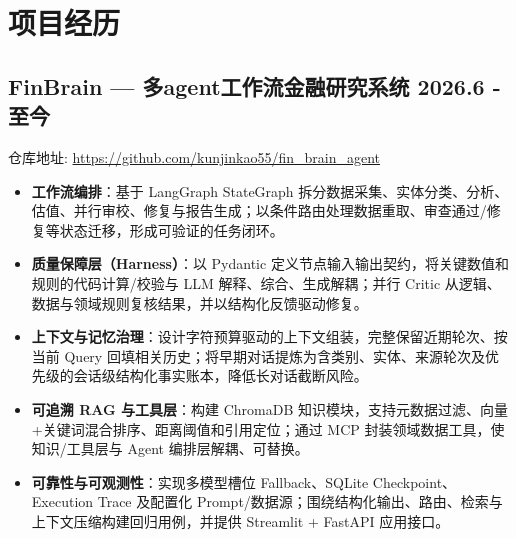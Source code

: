 \documentclass[10pt,a4paper]{article}
\newcommand{\datedsubsection}[2]{%
  \subsection[#1]{#1 \hfill #2}%
}
\begin{document}
\section{项目经历}
\datedsubsection{\textbf{FinBrain — 多agent工作流金融研究系统}}{2026.6 - 至今}
仓库地址: \url{https://github.com/kunjinkao55/fin_brain_agent}
\begin{itemize}
  \item \textbf{工作流编排}：基于 LangGraph StateGraph 拆分数据采集、实体分类、分析、估值、并行审校、修复与报告生成；以条件路由处理数据重取、审查通过/修复等状态迁移，形成可验证的任务闭环。
  \item \textbf{质量保障层（Harness）}：以 Pydantic 定义节点输入输出契约，将关键数值和规则的代码计算/校验与 LLM 解释、综合、生成解耦；并行 Critic 从逻辑、数据与领域规则复核结果，并以结构化反馈驱动修复。
  \item \textbf{上下文与记忆治理}：设计字符预算驱动的上下文组装，完整保留近期轮次、按当前 Query 回填相关历史；将早期对话提炼为含类别、实体、来源轮次及优先级的会话级结构化事实账本，降低长对话截断风险。
  \item \textbf{可追溯 RAG 与工具层}：构建 ChromaDB 知识模块，支持元数据过滤、向量+关键词混合排序、距离阈值和引用定位；通过 MCP 封装领域数据工具，使知识/工具层与 Agent 编排层解耦、可替换。
  \item \textbf{可靠性与可观测性}：实现多模型槽位 Fallback、SQLite Checkpoint、Execution Trace 及配置化 Prompt/数据源；围绕结构化输出、路由、检索与上下文压缩构建回归用例，并提供 Streamlit + FastAPI 应用接口。
\end{itemize}
\end{document}
